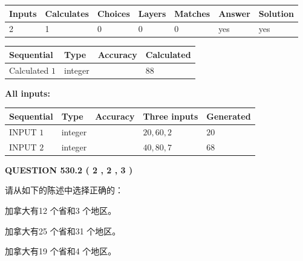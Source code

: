\documentclass{ctexart}
\begin{document}
   
\noindent\begin{tabular}{|l|l|l|l|l|l|l|}
 \hline
Inputs & Calculates & Choices & Layers & Matches & Answer & Solution \\ \hline
 2  & 
 1  & 
 0
  & 
 0  & 
 0  & 
  yes & 
  yes 
  \\ \hline
 \end{tabular}
   
   
   
   
\noindent{}
   
   
  
  
\noindent\begin{tabular}{|l|l|l|l|}
\hline
 Sequential & Type & Accuracy & Calculated \\ 
\hline
 
 
  Calculated $  1 $ & integer &  & 
  $ 88 $ 
 \\  \hline  
 \end{tabular}
   
   
   
   
\noindent\vspace{0.1in}\hspace{-0.08in} {\textbf{\Large{All inputs: }}}
   
   
  
  
\noindent\begin{tabular}{|l|l|l|l|l|}
\hline
 Sequential & Type & Accuracy & Three inputs & Generated \\ 
\hline
 
 
  INPUT $  1 $ & integer &  & $
 20
 , 
 60
 , 
 2
 $ & $ 20 $ 
 \\  \hline  
 
 
  INPUT $  2 $ & integer &  & $
 40
 , 
 80
 , 
 7
 $ & $ 68 $ 
 \\  \hline  
 \end{tabular}
   
   
  
\vspace{0.2in}
  
{\textbf{\Large{QUESTION
530.2 
 ( 2 , 2 , 3 )
}}}
  
  
请从如下的陈述中选择正确的：
 
 
加拿大有12 个省和3 个地区。
 
 
加拿大有25 个省和31 个地区。
 
 
加拿大有19 个省和4 个地区。
 
\end{document}
